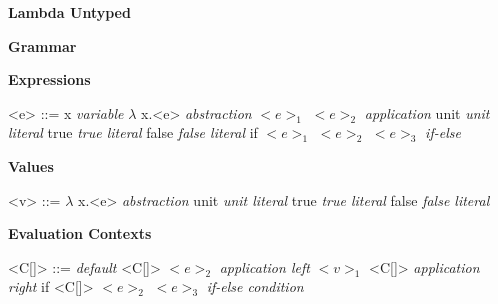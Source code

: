 \documentclass[11pt,oneside]{book}
\newcommand{\synlabel}[1]{\hfill \textit{#1}}
\begin{document}
\frontmatter

\mainmatter

\pagebreak

\begin{center}
    {
        \bf
        \huge
        Lambda Untyped
    }
\end{center}

\begin{center}
{
    \bf
    \huge
    Grammar
}
\end{center}


\setlength{\grammarindent}{10em} %

\setlength{\grammarparsep}{5pt} %

\textbf{Expressions}

\begin{grammar}

    <e> ::=  x                           \synlabel{variable}
        \alt $\lambda$ x.<e>             \synlabel{abstraction}
        \alt $<e>_1$ $<e>_2$             \synlabel{application}
        \alt unit                        \synlabel{unit literal}
        \alt true                        \synlabel{true literal}
        \alt false                       \synlabel{false literal}
        \alt if $<e>_1$ $<e>_2$ $<e>_3$  \synlabel{if-else}

\end{grammar}

\textbf{Values}

\begin{grammar}

    <v> ::=  $\lambda$ x.<e>            \synlabel{abstraction}
        \alt unit                       \synlabel{unit literal}
        \alt true                       \synlabel{true literal}
        \alt false                      \synlabel{false literal}

\end{grammar}

\textbf{Evaluation Contexts}

\begin{grammar}

    <C[\textbullet]> ::=  \textbullet                          \synlabel{default}
                     \alt <C[\textbullet]> $<e>_2$             \synlabel{application left}
                     \alt $<v>_1$ <C[\textbullet]>             \synlabel{application right}
                     \alt if <C[\textbullet]> $<e>_2$ $<e>_3$  \synlabel{if-else condition}
\end{grammar}
\end{document}

